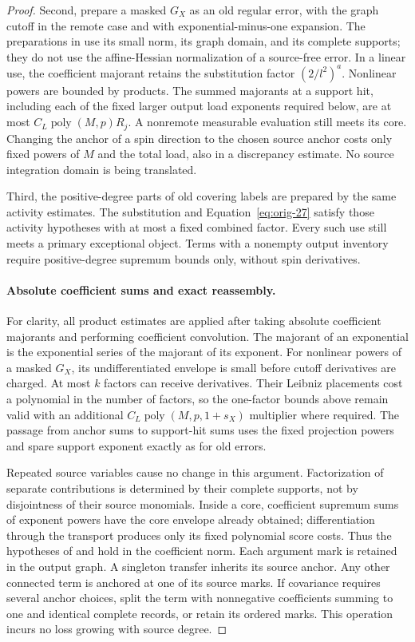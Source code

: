 \begin{proof}
Second, prepare a masked $G_X$ as an old regular error, with the
graph cutoff in the remote case and with exponential-minus-one
expansion.  The preparations in  use its small
norm, its graph domain, and its complete supports; they do not use
the affine-Hessian normalization of a source-free error.  In a
linear use, the coefficient majorant retains the substitution
factor $(2/l^2)^a$.  Nonlinear powers are bounded by products.
The summed majorants at a support hit, including each of the fixed
larger output load exponents required below, are at most
$C_L\operatorname{poly}(M,p)R_j$.  A nonremote measurable evaluation
still meets its core.  Changing the anchor of a spin direction to
the chosen source anchor costs only fixed powers of $M$ and the
total load, also in a discrepancy estimate.  No source integration
domain is being translated.

Third, the positive-degree parts of old covering labels are
prepared by the same activity estimates.  The substitution and
Equation~\eqref{eq:orig-27} satisfy those activity hypotheses with
at most a fixed combined factor.  Every such use still meets a
primary exceptional object.  Terms with a nonempty output
inventory require positive-degree supremum bounds only, without
spin derivatives.

\paragraph{Absolute coefficient sums and exact reassembly.}
For clarity, all product estimates are applied after taking
absolute coefficient majorants and performing coefficient
convolution.  The majorant of an exponential is the exponential
series of the majorant of its exponent.  For nonlinear powers of
a masked $G_X$, its undifferentiated envelope is small before
cutoff derivatives are charged.  At most $k$ factors can receive
derivatives.  Their Leibniz placements cost a polynomial in the
number of factors, so the one-factor bounds above remain valid
with an additional
$C_L\operatorname{poly}(M,p,1+s_X)$ multiplier where required.
The passage from anchor sums to support-hit sums uses the fixed
projection powers and spare support exponent exactly as for old
errors.

Repeated source variables cause no change in this argument.
Factorization of separate contributions is determined by their
complete supports, not by disjointness of their source monomials.
Inside a core, coefficient supremum sums of exponent powers have
the core envelope already obtained; differentiation through the
transport produces only its fixed polynomial score costs.
Thus the hypotheses of  and
 hold in the coefficient norm.  Each
argument mark is retained in the output graph.  A singleton
transfer inherits its source anchor.  Any other connected term is
anchored at one of its source marks.  If covariance requires
several anchor choices, split the term with nonnegative
coefficients summing to one and identical complete records, or
retain its ordered marks.  This operation incurs no loss growing
with source degree.


\end{proof}
